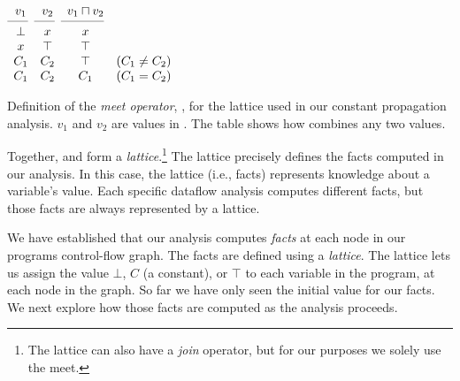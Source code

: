 \documentclass[12pt]{report}
\begin{document}
\begin{myfig}[tbh]
  \begin{math}
    \begin{array}{cccc}
      v_1 & v_2 & v_1 \lub v_2 \\
      \cmidrule(r){1-1}\cmidrule(r){2-2}\cmidrule(r){3-3}
      \bot & x & x \\
      x & \top & \top & \\ 
      C_1 & C_2 & \top & \text{($C_1 \neq C_2$)} \\
      C_1 & C_2 & C_1 & \text{($C_1 = C_2$)}
    \end{array}
  \end{math}
  \caption{Definition of the \emph{meet operator}, \lub, for the
    lattice used in our constant propagation analysis. $v_1$ and $v_2$
    are values in \setLC. The table shows how \lub combines any two
    values.}
  \label{tbl_back4}
\end{myfig}

Together, \setLC and \lub form a \emph{lattice}.\footnote{The lattice
  can also have a \emph{join} operator, but for our purposes we solely
  use the meet.}  The lattice precisely defines the facts computed in
our analysis. In this case, the lattice (i.e., facts) represents
knowledge about a variable's value. Each specific dataflow analysis
computes different facts, but those facts are always represented by a
lattice.

We have established that our analysis computes \emph{facts} at each
node in our programs control-flow graph. The facts are defined using a
\emph{lattice}. The lattice lets us assign the value $\bot$, $C$ (a
constant), or $\top$ to each variable in the program, at each node in
the graph. So far we have only seen the initial value for our
facts. We next explore how those facts are computed as the analysis 
proceeds.


\end{document}

